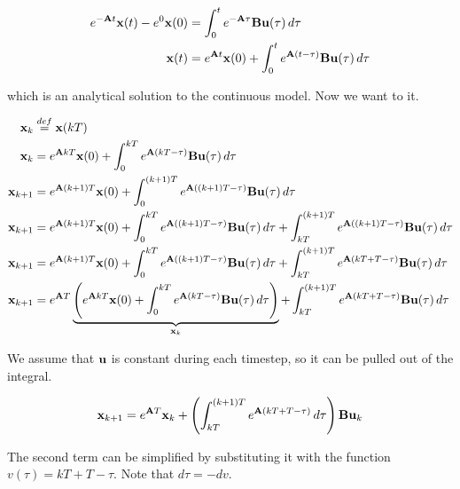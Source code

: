 \begin{align*}
  e^{-\mathbf{A}t}\mathbf{x}(t) - e^0\mathbf{x}(0) &=
    \int_0^t e^{-\mathbf{A}\tau}\mathbf{B}\mathbf{u}(\tau) \,d\tau \\
  \mathbf{x}(t) &= e^{\mathbf{A}t}\mathbf{x}(0) +
    \int_0^t e^{\mathbf{A}(t - \tau)}\mathbf{B}\mathbf{u}(\tau) \,d\tau
\end{align*}

which is an analytical solution to the continuous \gls{model}. Now we want to
 it.

\begin{align*}
  \mathbf{x}_k &\stackrel{def}{=} \mathbf{x}(kT) \\
  \mathbf{x}_k &= e^{\mathbf{A}kT}\mathbf{x}(0) +
    \int_0^{kT} e^{\mathbf{A}(kT - \tau)}\mathbf{B}\mathbf{u}(\tau) \,d\tau \\
  \mathbf{x}_{k+1} &= e^{\mathbf{A}(k + 1)T}\mathbf{x}(0) +
    \int_0^{(k + 1)T} e^{\mathbf{A}((k + 1)T - \tau)}\mathbf{B}\mathbf{u}(\tau) \,d\tau
    \\
  \mathbf{x}_{k+1} &= e^{\mathbf{A}(k + 1)T}\mathbf{x}(0) +
    \int_0^{kT} e^{\mathbf{A}((k + 1)T - \tau)}\mathbf{B}\mathbf{u}(\tau) \,d\tau +
    \int_{kT}^{(k + 1)T} e^{\mathbf{A}((k + 1)T - \tau)}\mathbf{B}\mathbf{u}(\tau)
    \,d\tau \\
  \mathbf{x}_{k+1} &= e^{\mathbf{A}(k + 1)T}\mathbf{x}(0) +
    \int_0^{kT} e^{\mathbf{A}((k + 1)T - \tau)}\mathbf{B}\mathbf{u}(\tau) \,d\tau +
    \int_{kT}^{(k + 1)T} e^{\mathbf{A}(kT + T - \tau)}\mathbf{B}\mathbf{u}(\tau) \,d\tau
    \\
  \mathbf{x}_{k+1} &= e^{\mathbf{A}T} \underbrace{\left(e^{\mathbf{A}kT}\mathbf{x}(0) +
    \int_0^{kT} e^{\mathbf{A}(kT - \tau)}\mathbf{B}\mathbf{u}(\tau)
    \,d\tau\right)}_{\mathbf{x}_k} +
    \int_{kT}^{(k + 1)T} e^{\mathbf{A}(kT + T - \tau)}\mathbf{B}\mathbf{u}(\tau) \,d\tau
\end{align*}

We assume that $\mathbf{u}$ is constant during each timestep, so it can be pulled
out of the integral.

\begin{equation*}
  \mathbf{x}_{k+1} = e^{\mathbf{A}T}\mathbf{x}_k +
    \left(\int_{kT}^{(k + 1)T} e^{\mathbf{A}(kT + T - \tau)} \,d\tau\right)
    \mathbf{B}\mathbf{u}_k
\end{equation*}

The second term can be simplified by substituting it with the function
$v(\tau) = kT + T - \tau$. Note that $d\tau = -dv$.

